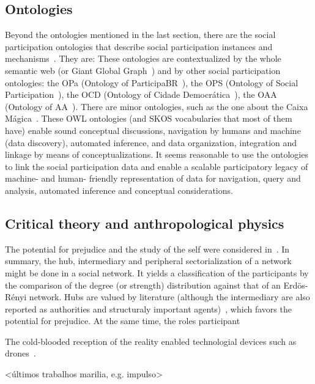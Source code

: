 \documentclass[letterpaper,10pt]{article}
\begin{document}
\subsection{Ontologies}
Beyond the ontologies mentioned in the last section,
there are the social participation ontologies that describe
social participation instances and mechanisms~\cite{p5}.
They are: 
These ontologies are contextualized by the whole semantic web
(or Giant Global Graph~\cite{ggg})
and by other social participation ontologies:
the OPa (Ontology of ParticipaBR~\cite{p5}), the OPS (Ontology of Social Participation~\cite{ops}),
the OCD (Ontology of Cidade Democrática~\cite{p5}), the OAA (Ontology of AA~\cite{oaa}).
There are minor ontologies, such as the one about the Caixa Mágica~\cite{cm}.
These OWL ontologies (and SKOS vocabularies that most of them have) enable
sound conceptual discussions, navigation by humans and machine (data discovery),
 automated inference, and data organization, integration and linkage by means of conceptualizations.
It seems reasonable to use the ontologies to link the social participation data
and enable a scalable participatory legacy of machine- and human- friendly representation
of data for navigation, query and analysis, automated inference
and conceptual considerations.

\subsection{Critical theory and anthropological physics}
The potential for prejudice and the study of the self
were considered in~\cite{imp,stab,tese}.
In summary, the hub, intermediary and peripheral sectorialization
of a network might be done in a social network.
It yields a classification of the participants
by the comparison of the degree (or strength) distribution
against that of an Erdös-Rényi network.
Hubs are valued by literature
(although the intermediary are also reported as authorities
and structuraly important agents)~\cite{ega},
which favors the potential for prejudice.
At the same time, the roles participant


The cold-blooded reception of the reality
enabled technologial devices such as drones~\cite{drones}.

<últimos trabalhos marilia, e.g. impulso>
\end{document}
